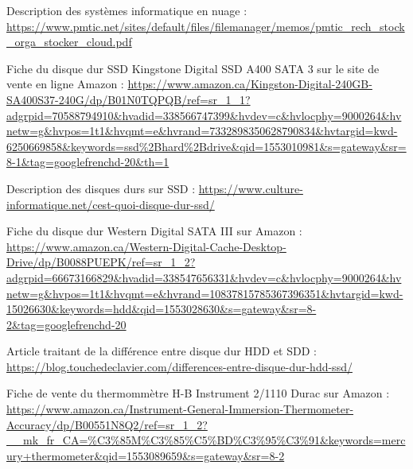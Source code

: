 \begin{thebibliographyUL}{9}
 Description des systèmes informatique en nuage :
\url{https://www.pmtic.net/sites/default/files/filemanager/memos/pmtic_rech_stock_orga_stocker_cloud.pdf}

Fiche du disque dur SSD Kingstone Digital SSD A400 SATA 3 sur le site de vente en ligne Amazon :
\url{https://www.amazon.ca/Kingston-Digital-240GB-SA400S37-240G/dp/B01N0TQPQB/ref=sr_1_1?adgrpid=70588794910&hvadid=338566747399&hvdev=c&hvlocphy=9000264&hvnetw=g&hvpos=1t1&hvqmt=e&hvrand=7332898350628790834&hvtargid=kwd-6250669858&keywords=ssd%2Bhard%2Bdrive&qid=1553010981&s=gateway&sr=8-1&tag=googlefrenchd-20&th=1}

 Description des disques durs sur SSD :
\url{https://www.culture-informatique.net/cest-quoi-disque-dur-ssd/}

 Fiche du disque dur Western Digital SATA III sur Amazon :
\url{https://www.amazon.ca/Western-Digital-Cache-Desktop-Drive/dp/B0088PUEPK/ref=sr_1_2?adgrpid=66673166829&hvadid=338547656331&hvdev=c&hvlocphy=9000264&hvnetw=g&hvpos=1t1&hvqmt=e&hvrand=10837815785367396351&hvtargid=kwd-15026630&keywords=hdd&qid=1553028630&s=gateway&sr=8-2&tag=googlefrenchd-20}

 Article traitant de la différence entre disque dur HDD et SDD :
\url{https://blog.touchedeclavier.com/differences-entre-disque-dur-hdd-ssd/}

 Fiche de vente du thermommètre H-B Instrument 2/1110 Durac sur Amazon :
\url{https://www.amazon.ca/Instrument-General-Immersion-Thermometer-Accuracy/dp/B00551N8Q2/ref=sr_1_2?__mk_fr_CA=%C3%85M%C3%85%C5%BD%C3%95%C3%91&keywords=mercury+thermometer&qid=1553089659&s=gateway&sr=8-2}







\end{thebibliographyUL}